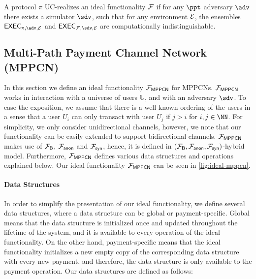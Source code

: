 \begin{definition}
A protocol $\pi$ UC-realizes an ideal functionality $\mathcal{F}$ if for any $\ppt$ adversary 
$\adv$ there exists a simulator $\sdv$, such that for any environment $\mathcal{E}$, the 
ensembles $\exec_{\pi, \adv, \dist}$ and $\exec_{\FF, \sdv, \dist}$ are computationally 
indistinguishable.
\end{definition}

\subsection{Multi-Path Payment Channel Network (MPPCN)}
\label{sec:mppcn}

In this section we define an ideal functionality $\mathcal{F}_{\mathsf{MPPCN}}$ for MPPCNs. 
$\mathcal{F}_{\mathsf{MPPCN}}$ works in interaction with a universe of users $\mathbb{U}$, and with an 
adversary $\sdv$. To ease the exposition, we assume that there is a 
well-known ordering of the users in a sense that a user $U_i$ can only transact with user $U_j$ 
if $j > i$ for $i,j \in \NN$. For simplicity, we only consider unidirectional channels, 
however, we note that our functionality can be easily extended to support bidirectional 
channels.  $\mathcal{F}_{\mathsf{MPPCN}}$ makes use of $\mathcal{F}_{\mathsf{B}}$, $\mathcal{F}_{\mathsf{anon}}$ and $\mathcal{F}_{\mathsf{syn}}$, 
hence, it is defined in $(\mathcal{F}_{\mathsf{B}}, \mathcal{F}_{\mathsf{anon}}, \mathcal{F}_{\mathsf{syn}})$-hybrid model. Furthermore, 
$\mathcal{F}_{\mathsf{MPPCN}}$ defines various data structures and operations explained below. 
Our ideal functionality $\mathcal{F}_{\mathsf{MPPCN}}$ can be seen in \cref{fig:ideal-mppcn}.

\paragraph{Data Structures} 
In order to simplify the presentation of our ideal functionality, we define several data 
structures, where a data structure can be global or payment-specific. Global means that the 
data structure is initialized once and updated throughout the lifetime of the system, and it 
is available to every operation of the ideal functionality. On the other hand, payment-specific 
means that the ideal functionality initializes a new empty copy of the corresponding data 
structure with every new payment, and therefore, the data structure is only available to 
the payment operation. Our data structures are defined as follows:

